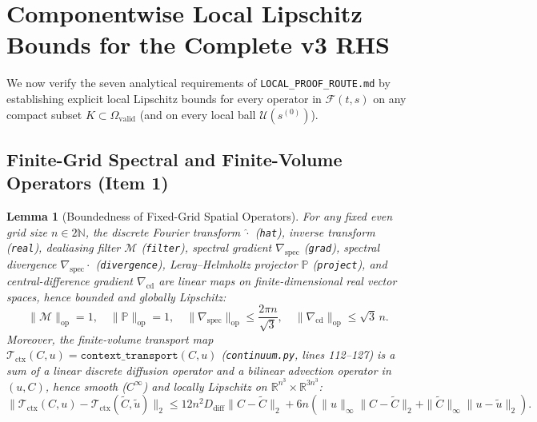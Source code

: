 \documentclass[11pt,a4paper]{article}
\newtheorem{lemma}[theorem]{Lemma}
\theoremstyle{definition}
\begin{document}
\section{Componentwise Local Lipschitz Bounds for the Complete v3 RHS}

We now verify the seven analytical requirements of \texttt{LOCAL\_PROOF\_ROUTE.md} by establishing explicit local Lipschitz bounds for every operator in $\mathcal{F}(t, s)$ on any compact subset $K \subset \Omega_{\mathrm{valid}}$ (and on every local ball $\mathcal{U}(s^{(0)})$).

\subsection{Finite-Grid Spectral and Finite-Volume Operators (Item 1)}

\begin{lemma}[Boundedness of Fixed-Grid Spatial Operators]
\label{lem:grid_ops}
For any fixed even grid size $n \in 2\mathbb{N}$, the discrete Fourier transform $\widehat{\cdot}$ (\texttt{hat}), inverse transform (\texttt{real}), dealiasing filter $\mathcal{M}$ (\texttt{filter}), spectral gradient $\nabla_{\mathrm{spec}}$ (\texttt{grad}), spectral divergence $\nabla_{\mathrm{spec}}\cdot$ (\texttt{divergence}), Leray--Helmholtz projector $\mathbb{P}$ (\texttt{project}), and central-difference gradient $\nabla_{\mathrm{cd}}$ are linear maps on finite-dimensional real vector spaces, hence bounded and globally Lipschitz:
\begin{equation}
  \|\mathcal{M}\|_{\mathrm{op}} = 1, \quad \|\mathbb{P}\|_{\mathrm{op}} = 1, \quad \|\nabla_{\mathrm{spec}}\|_{\mathrm{op}} \le \frac{2\pi n}{\sqrt{3}}, \quad \|\nabla_{\mathrm{cd}}\|_{\mathrm{op}} \le \sqrt{3}\,n.
\end{equation}
Moreover, the finite-volume transport map $\mathcal{T}_{\mathrm{ctx}}(C, u) = \texttt{context\_transport}(C, u)$ (\texttt{continuum.py}, lines 112--127) is a sum of a linear discrete diffusion operator and a bilinear advection operator in $(u, C)$, hence smooth ($C^\infty$) and locally Lipschitz on $\mathbb{R}^{n^3} \times \mathbb{R}^{3n^3}$:
\begin{equation}
  \|\mathcal{T}_{\mathrm{ctx}}(C, u) - \mathcal{T}_{\mathrm{ctx}}(\widetilde{C}, \widetilde{u})\|_2 \le 12 n^2 D_{\mathrm{diff}} \|C - \widetilde{C}\|_2 + 6n\left(\|u\|_\infty \|C - \widetilde{C}\|_2 + \|\widetilde{C}\|_\infty \|u - \widetilde{u}\|_2\right).
\end{equation}
\end{lemma}
\end{document}
